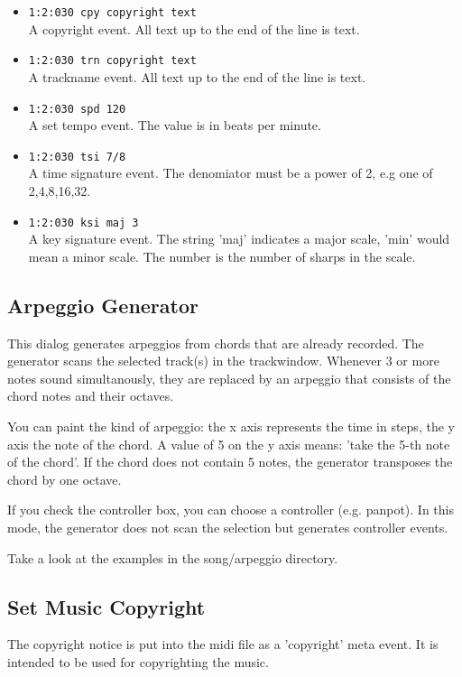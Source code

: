 \documentclass[letterpaper]{report}
\begin{document}
\begin{itemize}
\item {\tt 1:2:030 cpy copyright text}\\
        A copyright event. All text up to the end of the line is text.

\item {\tt 1:2:030 trn copyright text}\\
        A trackname event. All text up to the end of the line is text.

\item {\tt 1:2:030 spd 120}\\
        A set tempo event. The value is in beats per minute.

\item {\tt 1:2:030 tsi 7/8}\\
        A time signature event. The denomiator must be a power of 2, e.g one
        of 2,4,8,16,32.

\item {\tt 1:2:030 ksi maj 3}\\
        A key signature event. The string 'maj' indicates a major scale,
        'min' would mean a minor scale. The number is the number of
        sharps in the scale.

\end{itemize}



\subsection{Arpeggio Generator}\label{arpeg}

This dialog generates arpeggios from chords that are already recorded.
The generator scans the selected track(s) in the trackwindow. Whenever
3 or more notes sound simultanously, they are replaced by an arpeggio that
consists of the chord notes and their octaves.

You can paint the kind of arpeggio: the x axis represents the time in steps,
the y axis the note of the chord. A value of 5 on the y axis means: 'take
the 5-th note of the chord'. If the chord does not contain 5 notes, the
generator transposes the chord by one octave.

If you check the controller box, you can choose a controller (e.g. panpot).
In this mode, the generator does not scan the selection but generates controller
events.

Take a look at the examples in the song/arpeggio directory.


\subsection{Set Music Copyright}\label{muscopyr}
The copyright notice is put into the midi file as a 'copyright' meta event.
It is intended to be used for copyrighting the music.
\end{document}
